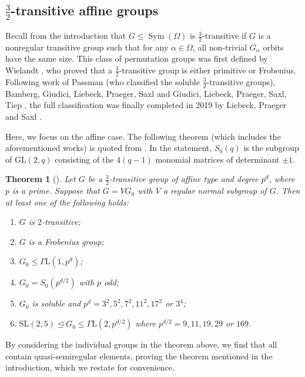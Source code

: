 \documentclass{article}
\newtheorem{thm}{Theorem}[section]
\theoremstyle{remark}
\theoremstyle{definition}
\DeclareMathOperator{\Sym}{Sym}
\newcommand{\GL}{\mathrm{GL}}
\newcommand{\SL}{\mathrm{SL}}
\newcommand{\qsres}{quasi-semiregular elements}
\begin{document}
\subsection{$\frac{3}{2}$-transitive affine groups}
\label{sec: 3/2-trans}

Recall from the introduction that $G\leqslant \Sym(\Omega)$ is $\frac{3}{2}$-transitive if $G$ is a nonregular transitive group such that for any $\alpha \in \Omega$, all   non-trivial $G_\alpha$ orbits  have the same size. This class of permutation groups was first defined by Wielandt \cite[\S10]{Wielandt}, who proved that a $\frac{3}{2}$-transitive group is either primitive or Frobenius. Following work of Passman \cite{Passman1,Passman2} (who classified the soluble $\frac{3}{2}$-transitive groups), Bamberg, Giudici, Liebeck, Praeger, Saxl \cite{Bambergetal} and Giudici, Liebeck, Praeger, Saxl, Tiep \cite{Giudicietal}, the full classification was finally completed in 2019 by Liebeck, Praeger and Saxl \cite{LPS2019}.

Here, we focus on the affine case. The following theorem (which includes the aforementioned works) is quoted from \cite{LPS2019}. In the statement, $S_0(q)$ is the subgroup of $\GL(2,q)$ consisting of the $4(q-1)$ monomial matrices of determinant $\pm1$. 

\begin{thm}[{\cite[Corollary 2]{LPS2019}}]
\label{thm: 3on2 thm}
Let $G$ be a $\frac{3}{2}$-transitive group of  affine type and  degree $p^d$, where $p$ is a prime.  Suppose that $G=VG_0$ with $V$ a  regular normal subgroup of $G$. Then at least one of the following holds:
\begin{enumerate}[(1)]
    \item $G$ is $2$-transitive;
    \item $G$ is a Frobenius group;
    \item $G_0\leqslant \Gamma\mathrm{L}(1,p^d)$;
    \item $G_0=S_0(p^{d/2})$ with $p$ odd;
    \item $G_0$ is soluble and $p^d=3^2,5^2,7^2,11^2,17^2$ or $3^4$;
    \item $\SL(2,5) \unlhd G_0\leqslant \Gamma\mathrm{L}(2,p^{d/2})$ where $p^{d/2}=9,11,19,29$ or $169$.
\end{enumerate}
\end{thm}

By considering the individual groups in the theorem above, we find that all contain {\qsres}, proving the theorem mentioned in the introduction, which we restate for convenience.
\end{document}
